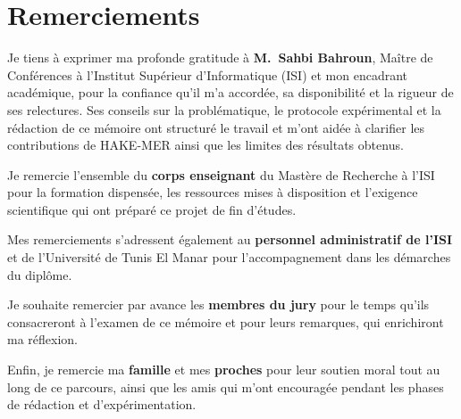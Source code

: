 \chapter*{Remerciements}
\thispagestyle{empty}

Je tiens à exprimer ma profonde gratitude à \textbf{M.~Sahbi Bahroun},
Maître de Conférences à l'Institut Supérieur d'Informatique (ISI) et
mon encadrant académique, pour la confiance qu'il m'a accordée, sa
disponibilité et la rigueur de ses relectures. Ses conseils sur la
problématique, le protocole expérimental et la rédaction de ce mémoire
ont structuré le travail et m'ont aidée à clarifier les contributions de
HAKE-MER ainsi que les limites des résultats obtenus.

Je remercie l'ensemble du \textbf{corps enseignant} du Mastère de
Recherche à l'ISI pour la formation dispensée, les ressources mises
à disposition et l'exigence scientifique qui ont préparé ce projet de fin
d'études.

Mes remerciements s'adressent également au \textbf{personnel administratif
de l'ISI} et de l'Université de Tunis El Manar pour l'accompagnement
dans les démarches du diplôme.

Je souhaite remercier par avance les \textbf{membres du jury} pour le
temps qu'ils consacreront à l'examen de ce mémoire et pour leurs
remarques, qui enrichiront ma réflexion.

Enfin, je remercie ma \textbf{famille} et mes \textbf{proches} pour leur
soutien moral tout au long de ce parcours, ainsi que les amis qui m'ont
encouragée pendant les phases de rédaction et d'expérimentation.

\vspace{1em}
\begin{flushright}
\textbf{\@author}
\end{flushright}
